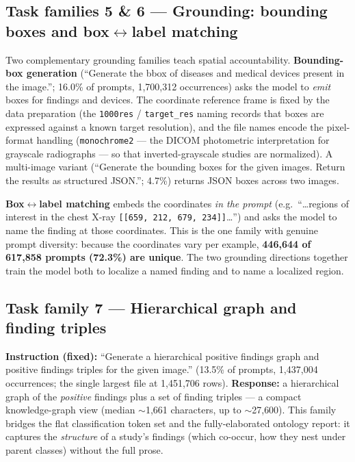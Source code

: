 \documentclass[11pt,a4paper]{article}
\begin{document}
\subsection{Task families 5 \& 6 --- Grounding: bounding boxes and box$\leftrightarrow$label matching}
\label{sec:grounding}
Two complementary grounding families teach spatial accountability. \textbf{Bounding-box generation} (``Generate the bbox of diseases and medical devices present in the image.''; 16.0\% of prompts, 1{,}700{,}312 occurrences) asks the model to \emph{emit} boxes for findings and devices. The coordinate reference frame is fixed by the data preparation (the \texttt{1000res} / \texttt{target\_res} naming records that boxes are expressed against a known target resolution), and the file names encode the pixel-format handling (\texttt{monochrome2} --- the DICOM photometric interpretation for grayscale radiographs --- so that inverted-grayscale studies are normalized). A multi-image variant (``Generate the bounding boxes for the given images. Return the results as structured JSON.''; 4.7\%) returns JSON boxes across two images.

\textbf{Box$\leftrightarrow$label matching} embeds the coordinates \emph{in the prompt} (e.g.\ ``\dots regions of interest in the chest X-ray \texttt{[[659, 212, 679, 234]]}\dots'') and asks the model to name the finding at those coordinates. This is the one family with genuine prompt diversity: because the coordinates vary per example, \textbf{446{,}644 of 617{,}858 prompts (72.3\%) are unique}. The two grounding directions together train the model both to localize a named finding and to name a localized region.

\subsection{Task family 7 --- Hierarchical graph and finding triples}
\textbf{Instruction (fixed):} ``Generate a hierarchical positive findings graph and positive findings triples for the given image.'' (13.5\% of prompts, 1{,}437{,}004 occurrences; the single largest file at 1{,}451{,}706 rows). \textbf{Response:} a hierarchical graph of the \emph{positive} findings plus a set of finding triples --- a compact knowledge-graph view (median $\sim$1{,}661 characters, up to $\sim$27{,}600). This family bridges the flat classification token set and the fully-elaborated ontology report: it captures the \emph{structure} of a study's findings (which co-occur, how they nest under parent classes) without the full prose.
\end{document}
